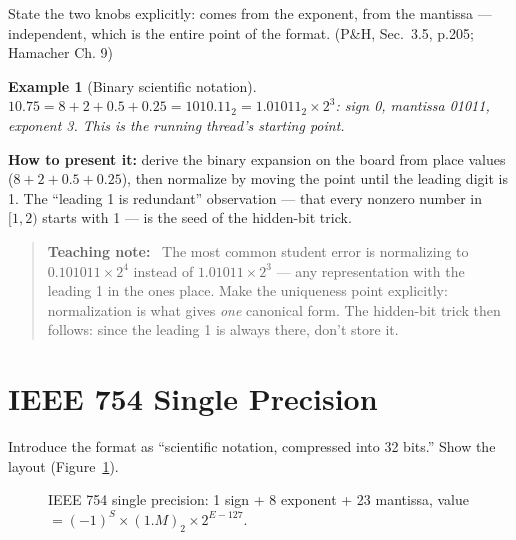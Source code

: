 \documentclass[11pt]{article}
\newtheorem{example}{Example}[section]
\newenvironment{teachingaside}{\begin{quote}\small\color{primary-gold}\textbf{Teaching note:}\ }{\end{quote}}
\begin{document}
State the two knobs explicitly:  comes from the exponent,  from the mantissa --- independent, which is the entire point of the format. (P\&H, Sec.~3.5, p.205; Hamacher Ch. 9) \cite{PattersonHennessy2017_computer_organization_design,Hamacher2002_computer_organization}

\begin{example}[Binary scientific notation]
$10.75 = 8+2+0.5+0.25 = 1010.11_2 = 1.01011_2 \times 2^3$: sign 0, mantissa 01011, exponent 3. This is the running thread's starting point.
\end{example}

\textbf{How to present it:} derive the binary expansion on the board from place values ($8+2+0.5+0.25$), then normalize by moving the point until the leading digit is 1. The ``leading 1 is redundant'' observation --- that every nonzero number in $[1,2)$ starts with 1 --- is the seed of the hidden-bit trick.

\begin{teachingaside}
The most common student error is normalizing to $0.101011 \times 2^4$ instead of $1.01011 \times 2^3$ --- any representation with the leading 1 in the ones place. Make the uniqueness point explicitly: normalization is what gives \emph{one} canonical form. The hidden-bit trick then follows: since the leading 1 is always there, don't store it.
\end{teachingaside}

\section{IEEE 754 Single Precision}

Introduce the format as ``scientific notation, compressed into 32 bits.'' Show the layout (Figure~\ref{fig:layout}).

\begin{figure}[h]
  \centering
  \caption{IEEE 754 single precision: 1 sign + 8 exponent + 23 mantissa, value $= (-1)^S \times (1.M)_2 \times 2^{E-127}$.}
  \label{fig:layout}
\end{figure}
\end{document}
